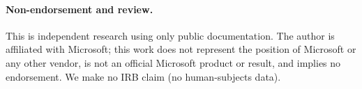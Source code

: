 \paragraph{Non-endorsement and review.} This is independent research using only
public documentation. The author is affiliated with Microsoft; this work does not
represent the position of Microsoft or any other vendor, is not an official
Microsoft product or result, and implies no endorsement. We make no IRB claim (no
human-subjects data).
